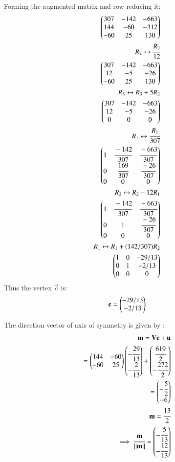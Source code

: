 \begin{enumerate}
\begin{align}
\end{align}
Forming the augmented matrix and row reducing it:
\begin{align}
\begin{pmatrix}307 & -142 & -663\\144 & -60 & -312 \\-60 & 25 &130 \end{pmatrix}\\
R_2\leftrightarrow \cfrac{R_2}{12} \nonumber \\
\begin{pmatrix}307 & -142 & -663\\12 & -5 & -26 \\-60 & 25 &130\end{pmatrix}\\
R_3\leftrightarrow R_3+5R_2 \nonumber \\
\begin{pmatrix}307 & -142 & -663\\12 & -5 & -26 \\0 & 0 &0\end{pmatrix}\\
R_1\leftrightarrow \cfrac{R_1}{307} \nonumber \\
\begin{pmatrix}1 & \cfrac{-142}{307} & \cfrac{-663}{307}\\0 & \cfrac{169}{307} & \cfrac{-26}{307} \\0 & 0 &0\end{pmatrix}\\ R_2\leftrightarrow R_2-12R_1 \nonumber \\
\begin{pmatrix}1 & \cfrac{-142}{307} & \cfrac{-663}{307}\\0 & 1 & \cfrac{-26}{307} \\0 & 0 &0\end{pmatrix}\\
R_1\leftrightarrow R_1 +(142/307)R_2 \nonumber \\
\begin{pmatrix}1 & 0 & -29/13\\0 & 1 & -2/13 \\0 & 0 &0\end{pmatrix}
\end{align}
Thus the vertex $\vec{c}$ is:
\begin{align}
\mathbf{c}=\begin{pmatrix} -29/13\\-2/13\end{pmatrix} 
\end{align}

The direction vector of axis of symmetry is given by :
\begin{align}
\mathbf{m}=\mathbf{Vc}+\mathbf{u}\\
=\begin{pmatrix}144&-60\\-60&25\end{pmatrix}\begin{pmatrix}-\cfrac{29}{13}\\-\cfrac{2}{13}\end{pmatrix}+\begin{pmatrix}\cfrac{619}{2}\\-\cfrac{272}{2}\end{pmatrix}\\
=\begin{pmatrix}-\cfrac{5}{2}\\-6\end{pmatrix}\\
\mathbf{m}=\cfrac{13}{2}\\
\implies \cfrac{\mathbf{m}}{\left\lVert\mathbf{m}\right\rVert}=\begin{pmatrix}-\cfrac{5}{13}\\-\cfrac{12}{13}\end{pmatrix}
\end{align}


\end{enumerate}
